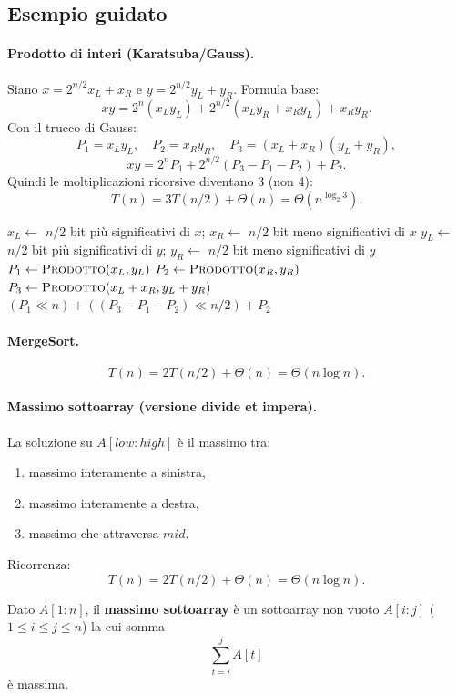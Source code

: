 \subsection{Esempio guidato}
\paragraph{Prodotto di interi (Karatsuba/Gauss).}
Siano $x=2^{n/2}x_L+x_R$ e $y=2^{n/2}y_L+y_R$.
Formula base:
\[
xy=2^n(x_Ly_L)+2^{n/2}(x_Ly_R+x_Ry_L)+x_Ry_R.
\]
Con il trucco di Gauss:
\[
P_1=x_Ly_L,\quad P_2=x_Ry_R,\quad P_3=(x_L+x_R)(y_L+y_R),
\]
\[
xy=2^nP_1+2^{n/2}(P_3-P_1-P_2)+P_2.
\]
Quindi le moltiplicazioni ricorsive diventano 3 (non 4):
\[
T(n)=3T(n/2)+\Theta(n)=\Theta(n^{\log_2 3}).
\]

\begin{algorithm}[H]
	\caption{\textsc{Prodotto}$(x,y)$}
	$x_L\gets$ $n/2$ bit più significativi di $x$;\;
	$x_R\gets$ $n/2$ bit meno significativi di $x$\;
	$y_L\gets$ $n/2$ bit più significativi di $y$;\;
	$y_R\gets$ $n/2$ bit meno significativi di $y$
	$P_1\gets\textsc{Prodotto}(x_L,y_L)$\;
	$P_2\gets\textsc{Prodotto}(x_R,y_R)$\;
	$P_3\gets\textsc{Prodotto}(x_L+x_R,y_L+y_R)$
	\Return $(P_1\ll n)+((P_3-P_1-P_2)\ll n/2)+P_2$
\end{algorithm}

\paragraph{MergeSort.}
\[
T(n)=2T(n/2)+\Theta(n)=\Theta(n\log n).
\]

\paragraph{Massimo sottoarray (versione divide et impera).}
La soluzione su $A[low:high]$ è il massimo tra:
\begin{enumerate}
	\item massimo interamente a sinistra,
	\item massimo interamente a destra,
	\item massimo che attraversa $mid$.
\end{enumerate}
Ricorrenza:
\[
T(n)=2T(n/2)+\Theta(n)=\Theta(n\log n).
\]

\begin{definizione}
	Dato $A[1:n]$, il \textbf{massimo sottoarray} è un sottoarray non vuoto
	$A[i:j]$ ($1\le i\le j\le n$) la cui somma
	\[
	\sum_{t=i}^{j} A[t]
	\]
	è massima.
\end{definizione}

